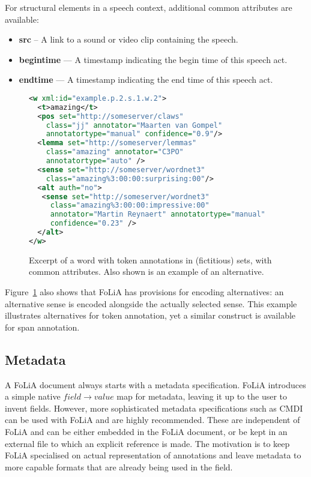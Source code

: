 \documentclass[a4paper,10pt,twoside]{article}
\begin{document}
For structural elements in a speech context, additional common attributes are
available:

\begin{itemize}
  \item \textbf{src} -- A link to a sound or video clip containing the speech.
  \item \textbf{begintime} --- A timestamp indicating the begin time of this speech act.
  \item \textbf{endtime} --- A timestamp indicating the end time of this speech act.
\end{itemize}

\begin{figure}[tbh]
\begin{lstlisting}[language=xml]
<w xml:id="example.p.2.s.1.w.2">
  <t>amazing</t>
  <pos set="http://someserver/claws" 
    class="jj" annotator="Maarten van Gompel"
    annotatortype="manual" confidence="0.9"/>
  <lemma set="http://someserver/lemmas"
    class="amazing" annotator="C3PO" 
    annotatortype="auto" />
  <sense set="http://someserver/wordnet3"
    class="amazing%3:00:00:surprising:00"/>
  <alt auth="no">
   <sense set="http://someserver/wordnet3"
     class="amazing%3:00:00:impressive:00"
     annotator="Martin Reynaert" annotatortype="manual"
     confidence="0.23" />
  </alt>
</w> 
\end{lstlisting}
\caption{Excerpt of a word with token annotations in (fictitious) sets, with common attributes. Also shown is an example of an alternative.\label{fig:wordannotation}} 
\end{figure}


Figure~\ref{fig:wordannotation} also shows that FoLiA has provisions for
encoding alternatives: an alternative sense is encoded alongside the actually
selected sense. This example illustrates alternatives for token annotation, yet a similar
construct is available for span annotation.


\subsection{Metadata}
\label{sec:metadata}

A FoLiA document always starts with a metadata specification. FoLiA introduces
a simple native $field \rightarrow value$ map for metadata, leaving it up to
the user to invent fields. However, more sophisticated metadata specifications
such as CMDI \cite{CMDI} can be used with FoLiA and are highly recommended.
These are independent of FoLiA and can be either embedded in the FoLiA
document, or be kept in an external file to which an explicit reference is
made. The motivation is to keep FoLiA specialised on actual representation
of annotations and leave metadata to more capable formats that are already
being used in the field.
\end{document}

